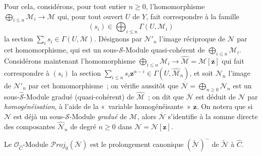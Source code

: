 \begin{env}[8.13.2]
\label{II.8.13.2-fr}
Pour cela, considérons, pour tout entier $n\geqslant0$, l'homomorphisme
$\bigoplus_{i\leqslant n}\mathcal{M}_i\to\mathcal{M}$ qui, pour tout ouvert
$U$ de $Y$, fait correspondre à la famille
\[
  (s_i)\in\bigoplus_{i\leqslant n}\Gamma(U,\mathcal{M}_i)
\]
la section $\sum_i s_i\in\Gamma(U,\mathcal{M})$. Désignons par
$\mathcal{N}'_n$ l'image réciproque de $\mathcal{N}$ par cet homomorphisme,
qui est un sous-$\mathcal{S}$-Module quasi-cohérent de
$\bigoplus_{i\leqslant n}\mathcal{M}_i$. Considérons maintenant
l'homomorphisme
$\bigoplus_{i\leqslant n}\mathcal{M}_i\to
\widehat{\mathcal{M}}=\mathcal{M}[\mathbf{z}]$ qui fait correspondre à $(s_i)$ la
section
$\sum_{i\leqslant n}s_i \mathbf{z}^{n-i}\in\Gamma(U,\widehat{\mathcal{M}}_n)$, et
soit $\mathcal{N}_n$ l'image de $\mathcal{N}'_n$ par cet homomorphisme~; on
vérifie aussitôt que
$\overline{\mathcal{N}}=\bigoplus_{n\geqslant0}\mathcal{N}_n$ est un
sous-$\widehat{\mathcal{S}}$-Module gradué (quasi-cohérent) de
$\widehat{\mathcal{M}}$~; on dit que $\overline{\mathcal{N}}$ est déduit de
$\mathcal{N}$ par \emph{homogénéisation}, à l'aide de la «~variable
homogénéisante~» $\mathbf{z}$. On notera
que si $\mathcal{N}$ est déjà un sous-$\mathcal{S}$-Module \emph{gradué} de
$\mathcal{M}$, alors $\overline{\mathcal{N}}$ s'identifie à la somme directe
des composantes $\widehat{\mathcal{N}}_n$ de degré $n\geqslant0$ dans
$\widehat{\mathcal{N}}=\mathcal{N}[\mathbf{z}]$.
\end{env}

\begin{proposition}[8.13.3]
\label{II.8.13.3-fr}
Le $\mathcal{O}_{\widehat{C}}$-Module
$\mathcal{P}\mathit{roj}_0(\overline{\mathcal{N}})$ est le prolongement canonique
$(\widetilde{\mathcal{N}})^{-}$ de $\widetilde{\mathcal{N}}$ à
$\widehat{C}$.
\end{proposition}

